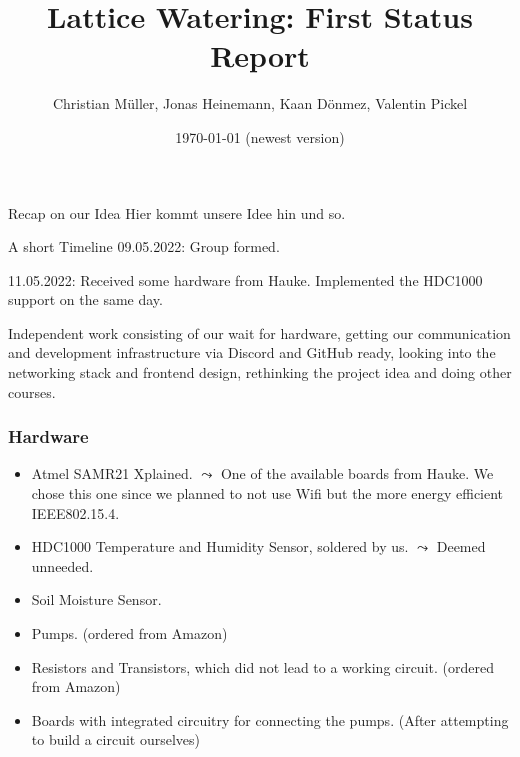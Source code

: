 \documentclass[10pt, xcolor=svgnames]{beamer}
\title{Lattice Watering: First Status Report}
\author{Christian Müller, Jonas Heinemann, Kaan Dönmez, Valentin Pickel}
\institute{
    Software Project on Internet Communication

    Summer Term 2022
    
    Freie Universität Berlin

    Institute for Computer Science
}
\date{\today{ }(newest version)}
\begin{document}
\maketitle

\begin{frame}{Recap on our Idea}
    Hier kommt unsere Idee hin und so.
\end{frame}

\begin{frame}{A short Timeline}
    09.05.2022: Group formed.

    \vspace*{0.25cm}

    11.05.2022: Received some hardware from Hauke. Implemented the HDC1000 support on the same day.

    \vspace*{0.25cm}

    Independent work consisting of our wait for hardware, getting our communication and development infrastructure via Discord and GitHub ready, looking into the networking stack and frontend design, rethinking the project idea and doing other courses.

    \vspace*{0.25cm}


\end{frame}

\begin{frame}
    \frametitle{Hardware}

    \begin{itemize}
        \item Atmel SAMR21 Xplained. \(\leadsto\) One of the available boards from Hauke. We chose this one since we planned to not use Wifi but the more energy efficient IEEE802.15.4.
        \item HDC1000 Temperature and Humidity Sensor, soldered by us. \(\leadsto\) Deemed unneeded.
        \item Soil Moisture Sensor.
        \item Pumps. (ordered from Amazon)
        \item Resistors and Transistors, which did not lead to a working circuit. (ordered from Amazon)
        \item Boards with integrated circuitry for connecting the pumps. (After attempting to build a circuit ourselves)
    \end{itemize}
\end{frame}
\end{document}
